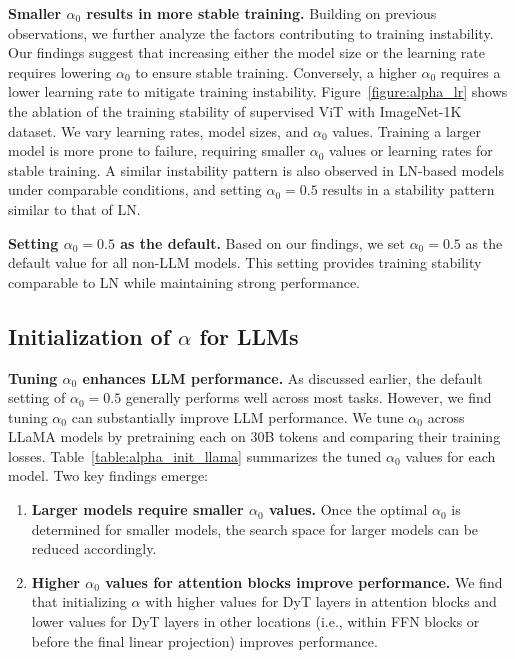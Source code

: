 \documentclass[]{fairmeta}
\renewcommand{\paragraph}[1]{\vspace{1.25mm}\noindent\textbf{#1}}
\begin{document}
\paragraph{Smaller $\alpha_0$ results in more stable training.} Building on previous observations, we further analyze the factors contributing to training instability. Our findings suggest that increasing either the model size or the learning rate requires lowering $\alpha_0$ to ensure stable training. Conversely, a higher $\alpha_0$ requires a lower learning rate to mitigate training instability.
Figure~\ref{figure:alpha_lr} shows the ablation of the training stability of supervised ViT with ImageNet-1K dataset. We vary learning rates, model sizes, and $\alpha_0$ values. Training a larger model is more prone to failure, requiring smaller $\alpha_0$ values or learning rates for stable training. A similar instability pattern is also observed in LN-based models under comparable conditions, and setting $\alpha_0 = 0.5$ results in a stability pattern similar to that of LN.


\paragraph{Setting $\alpha_0 = 0.5$ as the  default.} Based on our findings, we set $\alpha_0 = 0.5$ as the default value for all non-LLM models.
This setting provides training stability comparable to LN while maintaining strong performance.


\subsection{Initialization of $\alpha$ for LLMs}

\paragraph{Tuning $\alpha_0$ enhances LLM performance.} As discussed earlier, the default setting of $\alpha_0 = 0.5$ generally performs well across most tasks. However, we find tuning $\alpha_0$ can substantially improve LLM performance. We tune $\alpha_0$ across LLaMA models by pretraining each on 30B tokens and comparing their training losses. Table~\ref{table:alpha_init_llama} summarizes the tuned $\alpha_0$ values for each model. Two key findings emerge:
\begin{enumerate}
\item \textbf{Larger models require smaller $\alpha_0$ values.} Once the optimal $\alpha_0$ is determined for smaller models, the search space for larger models can be reduced accordingly.
\item \textbf{Higher $\alpha_0$ values for attention blocks improve performance.} We find that initializing $\alpha$ with higher values for DyT layers in attention blocks and lower values for DyT layers in other locations (i.e., within FFN blocks or before the final linear projection) improves performance. 
\end{enumerate}
\end{document}
